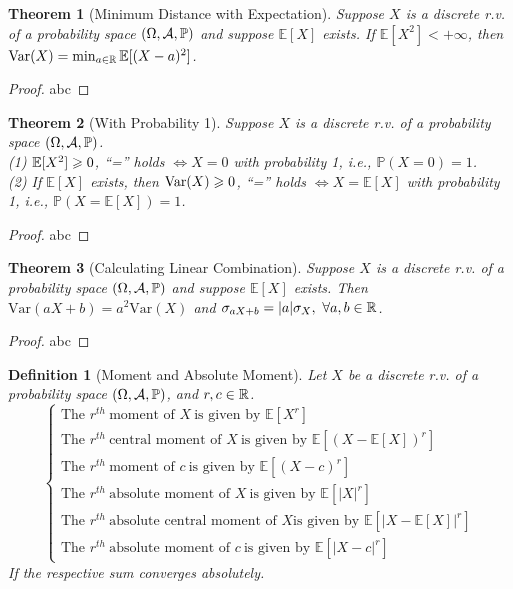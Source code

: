\documentclass[openany,12pt]{book}
\newtheorem{theorem}{Theorem}[chapter]
\newtheorem{definition}{Definition}[chapter]
\begin{document}
\begin{theorem}[Minimum Distance with Expectation]
Suppose $X$ is a discrete r.v. of a probability space $(\Omega,\mathcal{A},\mathbb{P})$ and suppose $\mathbb{E}[X]$ exists. If $\mathbb{E}[X^2]<+\infty$, then $\mathrm{Var}(X)=\min_{a\in\mathbb{R}}\mathbb{E}[(X-a)^2]$.
\end{theorem}

\begin{proof}
  abc
\end{proof}

\begin{theorem}[With Probability 1]
Suppose $X$ is a discrete r.v. of a probability space $(\Omega,\mathcal{A},\mathbb{P})$.\\
(1) $\mathbb{E}[X^2]\geqslant0$, ``='' holds $\Leftrightarrow X=0$ with probability 1, i.e., $\mathbb{P}(X=0)=1$.\\
(2) If $\mathbb{E}[X]$ exists, then $\mathrm{Var}(X)\geqslant0$, ``='' holds $\Leftrightarrow X=\mathbb{E}[X]$ with probability 1, i.e., $\mathbb{P}(X=\mathbb{E}[X])=1$.
\end{theorem}

\begin{proof}
  abc
\end{proof}

\begin{theorem}[Calculating Linear Combination]
Suppose $X$ is a discrete r.v. of a probability space $(\Omega,\mathcal{A},\mathbb{P})$ and suppose $\mathbb{E}[X]$ exists. Then $\mathrm{Var}(aX+b)=a^2 \mathrm{Var}(X)$ and $\sigma_{aX+b}=|a| \sigma_X,\ \forall a,b\in\mathbb{R}$.
\end{theorem}

\begin{proof}
  abc
\end{proof}

\begin{definition}[Moment and Absolute Moment]
Let $X$ be a discrete r.v. of a probability space $(\Omega,\mathcal{A},\mathbb{P})$, and $r,c\in\mathbb{R}$.
$$\left\{
\begin{array}{l}
\text{The }r^{th}\ \text{moment of } X\ \text{is given by } \mathbb{E}[X^r]   \\                              
\text{The }r^{th}\ \text{central moment of } X\ \text{is given by } \mathbb{E}[(X-\mathbb{E}[X])^r]\\
\text{The }r^{th}\ \text{moment of } c\ \text{is given by } \mathbb{E}[(X-c)^r]      \\     
\text{The }r^{th}\ \text{absolute moment of } X\ \text{is given by } \mathbb{E}[|X|^r]\\
\text{The }r^{th}\ \text{absolute central moment of } X \text{is given by } \mathbb{E}[|X-\mathbb{E}[X] |^r]  \\
\text{The } r^{th}\ \text{absolute moment of } c\ \text{is given by } \mathbb{E}[|X-c|^r] 
\end{array}
\right.$$
If the respective sum converges absolutely.
\end{definition}
\end{document}
